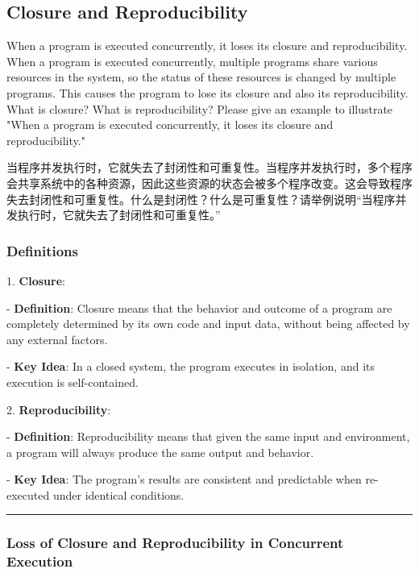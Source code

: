 \documentclass[a4paper]{book}
\begin{document}
\subsection{Closure and Reproducibility}

\begin{greenbox}
When a program is executed concurrently, it loses its closure and reproducibility. When a program is executed concurrently, multiple programs share various resources in the system, so the status of these resources is changed by multiple programs. This causes the program to lose its closure and also its reproducibility. What is closure? What is reproducibility? Please give an example to illustrate "When a program is executed concurrently, it loses its closure and reproducibility."
\end{greenbox}

当程序并发执行时，它就失去了封闭性和可重复性。当程序并发执行时，多个程序会共享系统中的各种资源，因此这些资源的状态会被多个程序改变。这会导致程序失去封闭性和可重复性。什么是封闭性？什么是可重复性？请举例说明“当程序并发执行时，它就失去了封闭性和可重复性。”

\subsubsection{Definitions}

1. \textbf{Closure}:  
   
   - \textbf{Definition}: Closure means that the behavior and outcome of a program are completely determined by its own code and input data, without being affected by any external factors.  
   
   - \textbf{Key Idea}: In a closed system, the program executes in isolation, and its execution is self-contained.

2. \textbf{Reproducibility}:  
   
   - \textbf{Definition}: Reproducibility means that given the same input and environment, a program will always produce the same output and behavior.  
   
   - \textbf{Key Idea}: The program’s results are consistent and predictable when re-executed under identical conditions.

\rule{0.75\textwidth}{0.5pt}

\subsubsection{Loss of Closure and Reproducibility in Concurrent Execution}
\end{document}
